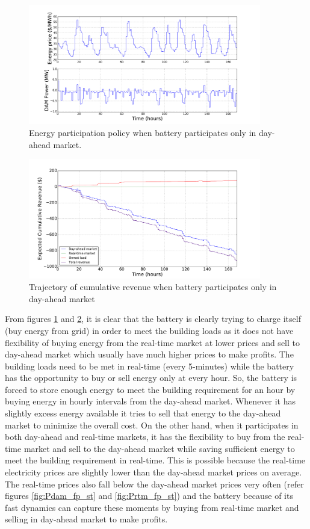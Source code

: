 \documentclass[11pt,twoside]{article}
\begin{document}
\begin{figure}[h!]
\begin{center}
\includegraphics[width=4in]
{Figures/Plots/onlydam/Pdam_fp_st.pdf} \caption{Energy participation policy when battery participates only in day-ahead market.}\label{fig:Pdam_onlydam}\end{center}
\end{figure}
\begin{figure}[h!]
\begin{center}
\includegraphics[width=4in]
{Figures/Plots/onlydam/cumulative_rev_fp_st.pdf} \caption{Trajectory of cumulative revenue when battery participates only in day-ahead market}\label{fig:cumulative_rev_onlydam}\end{center}
\end{figure}
From figures \ref{fig:Pdam_onlydam} and \ref{fig:cumulative_rev_onlydam}, it is clear that the battery is clearly trying to charge itself (buy energy from grid) in order to meet the building loads as it does not have flexibility of buying energy from the real-time market at lower prices and sell to day-ahead market which usually have much higher prices to make profits. The building loads need to be met in real-time (every 5-minutes) while the battery has the opportunity to buy or sell energy only at every hour. So, the battery is forced to store enough energy to meet the building requirement for an hour by buying energy in hourly intervals from the day-ahead market. Whenever it has slightly excess energy available it tries to sell that energy to the day-ahead market to minimize the overall cost. On the other hand, when it participates in both day-ahead and real-time markets, it has the flexibility to buy from the real-time market and sell to the day-ahead market while saving sufficient energy to meet the building requirement in real-time. This is possible because the real-time electricity prices are slightly lower than the day-ahead market prices on average. The real-time prices also fall below the day-ahead market prices very often (refer figures \ref{fig:Pdam_fp_st} and \ref{fig:Prtm_fp_st}) and the battery because of its fast dynamics can capture these moments by buying from real-time market and selling in day-ahead market to make profits. 
\end{document}

